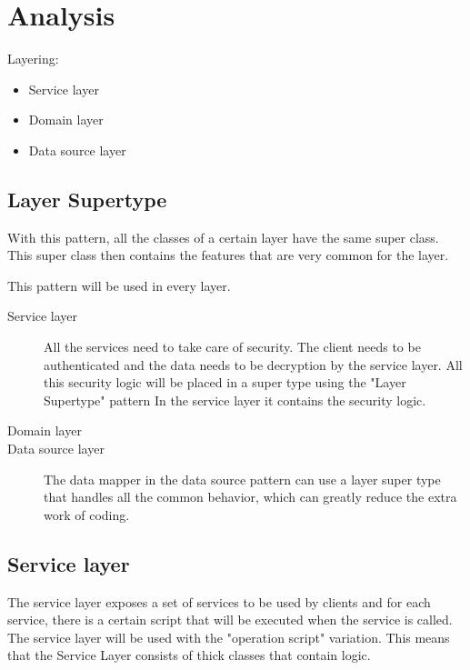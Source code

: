 \chapter{Analysis}
\label{ch:analysis}


Layering: 
\begin{itemize}
\item Service layer
\item Domain layer
\item Data source layer
\end{itemize}

\section{Layer Supertype}

With this pattern, all the classes of a certain layer have the same super class. This super class then contains the features that are very common for the layer.

This pattern will be used in every layer.
\begin{description}
\item[Service layer] All the services need to take care of security. The client needs to be authenticated and the data needs to be decryption by the service layer. All this security logic will be placed in a super type using the "Layer Supertype" pattern In the service layer it contains the security logic.

\item[Domain layer]


\item[Data source layer]
The data mapper in the data source pattern can use a layer super type that handles all the common behavior, which can greatly reduce the extra work of coding. 

\end{description}

\section{Service layer}
The service layer exposes a set of services to be used by clients and for each service, there is a certain script that will be executed when the service is called. The service layer will be used with the "operation script" variation. This means that the Service Layer consists of thick classes that contain logic. 

